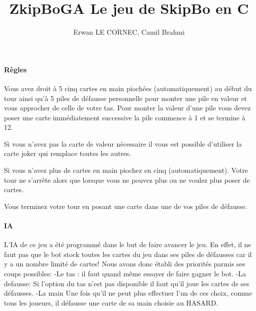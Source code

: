 \documentclass[10pt,a4paper]{article}
\title{\textbf{ZkipBoGA} Le jeu de SkipBo en C}
\author{Erwan LE CORNEC, Camil Brahmi}
\date{}
\begin{document}
\maketitle
\newpage
\paragraph{Règles}

Vous avez droit à 5 cinq cartes en main piochées (automatiquement) au début du tour ainsi qu'à 5 piles de défausse personnelle pour monter une pile en valeur et vous approcher de celle de votre tas.
Pour monter la valeur d'une pile vous devez poser une carte immédiatement successive la pile commence  à 1 et se termine à 12.

Si vous n'avez pas la carte de valeur nécessaire il vous est possible d'utiliser la carte joker qui remplace toutes les autres.

Si vous n'avez plus de cartes en main piochez en cinq (automatiquement).
Votre tour ne s'arrête alors que lorsque vous ne pouvez plus ou ne voulez plus poser de cartes.

Vous terminez votre tour en posant une carte dans une de vos piles de défausse.

\paragraph{IA}

L'IA de ce jeu a été programmé dans le but de faire avancer le jeu. En effet, il ne faut pas que le bot stock toutes les cartes du jeu dans ses piles de défausses car il y a un nombre limité de cartes!
Nous avons donc établi des priorités parmis ses coups possibles:
-Le tas : il faut quand même essayer de faire gagner le bot.
-La defausse: Si l'option du tas n'est pas disponible il faut qu'il joue les cartes de ses défausses.
-La main
Une fois qu'il ne peut plus effectuer l'un de ces choix, comme tous les joueurs, il défausse une carte de sa main choisie au HASARD.
\end{document}
